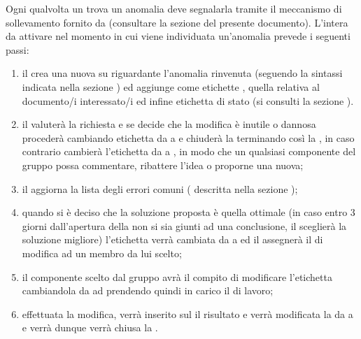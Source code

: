 				Ogni qualvolta un  trova un anomalia deve segnalarla tramite il meccanismo di sollevamento  fornito da  (consultare la sezione  del presente documento). L'intera  da attivare nel momento in cui viene individuata un'anomalia prevede i seguenti passi:
				\begin{enumerate}
				    \item il  crea una nuova  su  riguardante l'anomalia rinvenuta (seguendo la sintassi indicata nella sezione ) ed aggiunge come etichette , quella relativa al documento/i interessato/i ed infine etichetta di stato  (si consulti la sezione ).
				    \item il  valuterà la richiesta e se decide che la modifica è inutile o dannosa procederà cambiando etichetta da  a  e chiuderà la  terminando così la , in caso contrario cambierà l'etichetta da  a , in modo che un qualsiasi componente del gruppo possa commentare, ribattere l'idea o proporne una nuova;
				    \item il  aggiorna la lista degli errori comuni ( descritta nella sezione );
				    \item quando si è deciso che la soluzione proposta è quella ottimale (in caso entro 3 giorni dall'apertura della  non si sia giunti ad una conclusione, il  sceglierà la soluzione migliore) l'etichetta verrà cambiata da  a  ed il  assegnerà il  di modifica ad un membro da lui scelto;
				    \item il componente scelto dal gruppo avrà il compito di modificare l'etichetta cambiandola da  ad  prendendo quindi in carico il  di lavoro;
				    \item effettuata la modifica, verrà inserito sul  il risultato e verrà modificata la  da  a  e verrà dunque verrà chiusa la .
			\end{enumerate}
